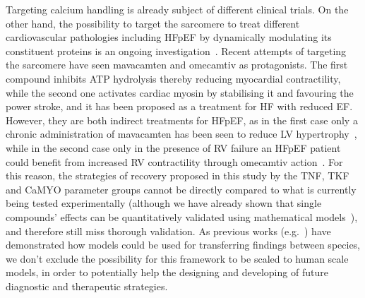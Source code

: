\vspace{0.2cm}
Targeting calcium handling is already subject of different clinical trials. On the other hand, the possibility to target the sarcomere to treat different cardiovascular pathologies including HFpEF by dynamically modulating its constituent proteins is an ongoing investigation~\cite{Patel:2019}. Recent attempts of targeting the sarcomere have seen mavacamten and omecamtiv as protagonists. The first compound inhibits ATP hydrolysis thereby reducing myocardial contractility, while the second one activates cardiac myosin by stabilising it and favouring the power stroke, and it has been proposed as a treatment for HF with reduced EF. However, they are both indirect treatments for HFpEF, as in the first case only a chronic administration of mavacamten has been seen to reduce LV hypertrophy~\cite{Green:2016}, while in the second case only in the presence of RV failure an HFpEF patient could benefit from increased RV contractility through omecamtiv action~\cite{Planelles-Herrero:2017}. For this reason, the strategies of recovery proposed in this study by the TNF, TKF and CaMYO parameter groups cannot be directly compared to what is currently being tested experimentally (although we have already shown that single compounds' effects can be quantitatively validated using mathematical models~\cite{Longobardi:2021}), and therefore still miss thorough validation. As previous works (e.g.~\cite{Fernandez-Chas:2018}) have demonstrated how models could be used for transferring findings between species, we don't exclude the possibility for this framework to be scaled to human scale models, in order to potentially help the designing and developing of future diagnostic and therapeutic strategies.

\vspace{0.2cm}\noindent
{}


